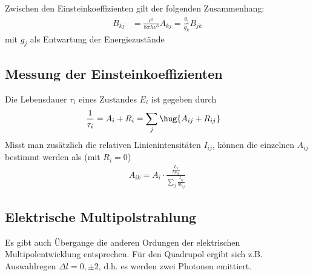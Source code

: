 \documentclass[twocolumn]{summery_4.1}
\begin{document}
Zwischen den Einsteinkoeffizienten gilt der folgenden Zusammenhang:
\begin{align*}
    B_{kj} &= \frac{c^3} {8\pi h \nu^3}A_{kj} =\frac{g_j}{g_k} B_{jk}
\end{align*}
mit \(g_j\) als Entwartung der Energiezustände

\subsection{Messung der Einsteinkoeffizienten}
Die Lebensdauer \(\tau_i\) eines Zustandes \(E_i\) ist gegeben durch
\begin{align*}
    \frac{1}{\tau_i} &= A_i + R_i= \sum_j \hug{A_{ij} + R_{ij}}
\end{align*}
Misst man zusätzlich die relativen Linienintensitäten \(I_{ij}\), können die einzelnen \(A_{ij}\) bestimmt werden als (mit \(R_i = 0\))
\begin{align*}
    A_{ik} = A_i \cdot \frac{\frac{I_{ik}}{h\nu_{ik}}}{\sum_j \frac{I_{ij}}{h\nu_{ij}}}
\end{align*}

\subsection{Elektrische Multipolstrahlung}
Es gibt auch Übergange die anderen Ordungen der elektrischen Multipolentwicklung entsprechen.
Für den Quadrupol ergibt sich z.B. Auswahlregen \(\Delta l=0,\pm2\), d.h. es werden zwei Photonen emittiert.
\end{document}
